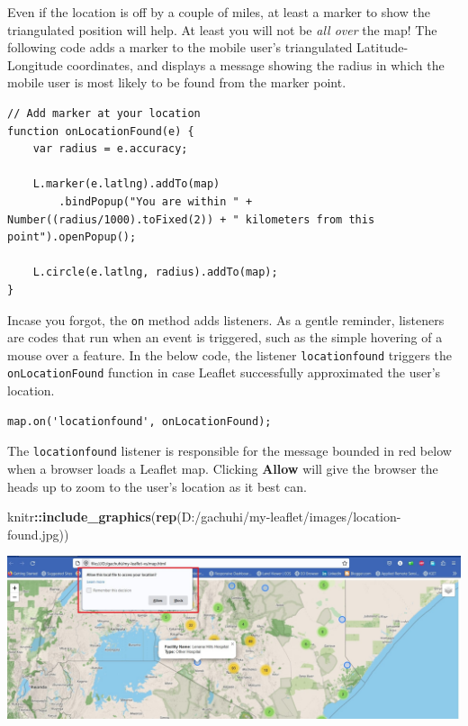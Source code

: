 \documentclass[
]{book}
\newenvironment{Shaded}{\begin{snugshade}}{\end{snugshade}}
\newcommand{\FunctionTok}[1]{\textcolor[rgb]{0.13,0.29,0.53}{\textbf{#1}}}
\newcommand{\NormalTok}[1]{#1}
\newcommand{\SpecialCharTok}[1]{\textcolor[rgb]{0.81,0.36,0.00}{\textbf{#1}}}
\newcommand{\StringTok}[1]{\textcolor[rgb]{0.31,0.60,0.02}{#1}}
\begin{document}
Even if the location is off by a couple of miles, at least a marker to show the triangulated position will help. At least you will not be \emph{all over} the map! The following code adds a marker to the mobile user's triangulated Latitude-Longitude coordinates, and displays a message showing the radius in which the mobile user is most likely to be found from the marker point.

\begin{verbatim}
// Add marker at your location
function onLocationFound(e) {
    var radius = e.accuracy;

    L.marker(e.latlng).addTo(map)
        .bindPopup("You are within " + Number((radius/1000).toFixed(2)) + " kilometers from this point").openPopup();

    L.circle(e.latlng, radius).addTo(map);
}
\end{verbatim}

Incase you forgot, the \texttt{on} method adds listeners. As a gentle reminder, listeners are codes that run when an event is triggered, such as the simple hovering of a mouse over a feature. In the below code, the listener \texttt{\textquotesingle{}locationfound\textquotesingle{}} triggers the \texttt{onLocationFound} function in case Leaflet successfully approximated the user's location.

\begin{verbatim}
map.on('locationfound', onLocationFound);
\end{verbatim}

The \texttt{locationfound} listener is responsible for the message bounded in red below when a browser loads a Leaflet map. Clicking \textbf{Allow} will give the browser the heads up to zoom to the user's location as it best can.

\begin{Shaded}
\begin{Highlighting}[]
\NormalTok{knitr}\SpecialCharTok{::}\FunctionTok{include\_graphics}\NormalTok{(}\FunctionTok{rep}\NormalTok{(}\StringTok{\textquotesingle{}D:/gachuhi/my{-}leaflet/images/location{-}found.jpg\textquotesingle{}}\NormalTok{))}
\end{Highlighting}
\end{Shaded}

\includegraphics{../images/location-found.jpg}
\end{document}
